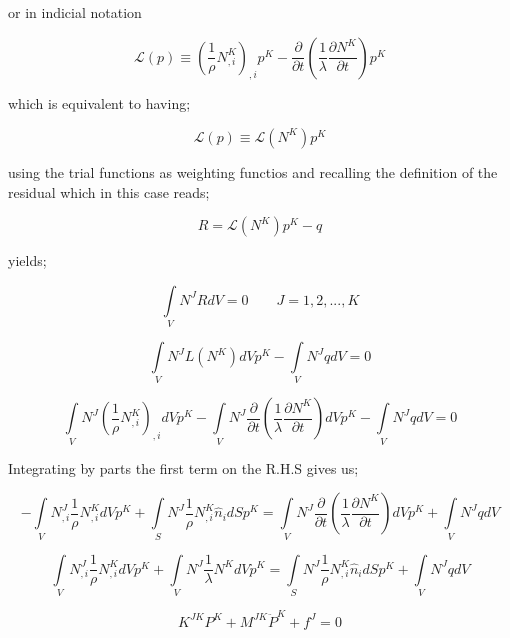 or in indicial notation

\[\mathcal{L}(p) \equiv {\left( {\frac{1}{\rho }N_{,i}^K} \right)_{,i}}{p^K} - \frac{\partial }{{\partial t}}\left( {\frac{1}{\lambda }\frac{{\partial {N^K}}}{{\partial t}}} \right){p^K}\]

which is equivalent to having;

\[\mathcal{L}(p) \equiv \mathcal{L}({N^K}){p^K}\]

using the trial functions as weighting functios and recalling the definition of the residual which in this case reads;

\[R = \mathcal{L}({N^K}){p^K} - q\]

yields;

\[\int\limits_V {{N^J}RdV = 0} \quad \quad J=1,2,...,K \]

\[\int\limits_V {{N^J}L({N^K})dV{p^K}}  - \int\limits_V {{N^J}qdV}  = 0\]

\[\int\limits_V {{N^J}{{\left( {\frac{1}{\rho }N_{,i}^K} \right)}_{,i}}dV{p^K} - \int\limits_V {{N^J}\frac{\partial }{{\partial t}}\left( {\frac{1}{\lambda }\frac{{\partial {N^K}}}{{\partial t}}} \right)dV{p^K}} }  - \int\limits_V {{N^J}qdV}  = 0\]

Integrating by parts the first term on the R.H.S gives us;

\[ - \int\limits_V {N_{,i}^J\frac{1}{\rho }N_{,i}^KdV} {p^K} + \int\limits_S {{N^J}\frac{1}{\rho }N_{,i}^K{{\hat n}_i}dS{p^K}}  = \int\limits_V {{N^J}\frac{\partial }{{\partial t}}\left( {\frac{1}{\lambda }\frac{{\partial {N^K}}}{{\partial t}}} \right)dV{p^K}}  + \int\limits_V {{N^J}qdV} \]

\[\int\limits_V {N_{,i}^J\frac{1}{\rho }N_{,i}^KdV} {p^K} + \int\limits_V {{N^J}\frac{1}{\lambda }{N^K}dV{{\ddot p}^K}}  = \int\limits_S {{N^J}\frac{1}{\rho }N_{,i}^K{{\hat n}_i}dS{p^K}}  + \int\limits_V {{N^J}qdV} \]

\[{K^{JK}}{P^K} + {M^{JK}}{{\ddot P}^K} + {f^J} = 0\]


